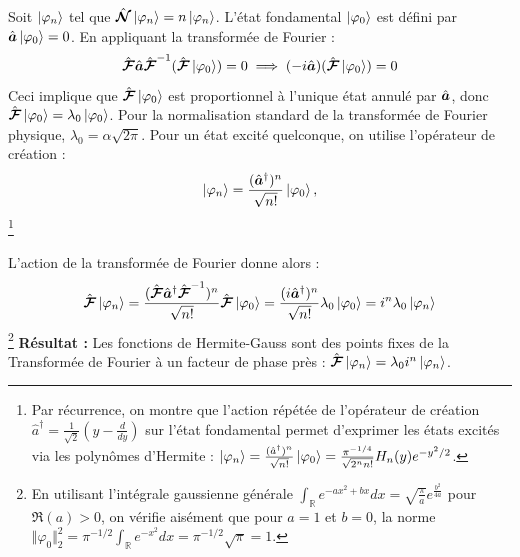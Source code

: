 \smallskip 
Soit $\ket{\varphi_n}$ tel que $\hat{\bm{\mathcal N}}\ket{\varphi_n} = n\ket{\varphi_n}$. L'état fondamental $\ket{\varphi_0}$ est défini par $\hat{\bm{a}}\ket{\varphi_0} = 0$. En appliquant la transformée de Fourier :
\begin{equation}
    \hat{\bm{\mathcal{F}}} \hat{\bm{a}} \hat{\bm{\mathcal{F}}}^{-1} (\hat{\bm{\mathcal{F}}}\ket{\varphi_0}) = 0 \implies (-i\hat{\bm{a}}) (\hat{\bm{\mathcal{F}}}\ket{\varphi_0}) = 0
\end{equation}
Ceci implique que $\hat{\bm{\mathcal{F}}}\ket{\varphi_0}$ est proportionnel à l'unique état annulé par $\hat{\bm{a}}$, donc $\hat{\bm{\mathcal{F}}}\ket{\varphi_0} = \lambda_0 \ket{\varphi_0}$. Pour la normalisation standard de la transformée de Fourier physique, $\lambda_0 = \alpha \sqrt{2 \pi}$. Pour un état excité quelconque, on utilise l'opérateur de création :
\begin{equation}
    \ket{\varphi_n} = \frac{(\hat{\bm{a}}^\dagger)^n}{\sqrt{n!}} \ket{\varphi_0},
\end{equation}
\footnote{Par récurrence, on montre que l'action répétée de l'opérateur de création $\hat{a}^\dag = \frac{1}{\sqrt{2}}(y - \frac{d}{dy})$ sur l'état fondamental permet d'exprimer les états excités via les polynômes d'Hermite : $\ket{\varphi_n} = \frac{(\hat{a}^\dag)^n}{\sqrt{n!}}\ket{\varphi_0} = \frac{\pi^{-1/4}}{\sqrt{2^n n!}} H_n(y) e^{-y^2/2}$.}

L'action de la transformée de Fourier donne alors :
\begin{equation}
    \hat{\bm{\mathcal{F}}} \ket{\varphi_n} = \frac{(\hat{\bm{\mathcal{F}}} \hat{\bm{a}}^\dagger \hat{\bm{\mathcal{F}}}^{-1})^n}{\sqrt{n!}} \hat{\bm{\mathcal{F}}} \ket{\varphi_0} = \frac{(i \hat{\bm{a}}^\dagger)^n}{\sqrt{n!}} \lambda_0 \ket{\varphi_0} = i^n \lambda_0 \ket{\varphi_n}
\end{equation}
\footnote{En utilisant l'intégrale gaussienne générale $\int_{\mathbb{R}} e^{-ax^2 + bx} dx = \sqrt{\frac{\pi}{a}} e^{\frac{b^2}{4a}}$ pour $\Re(a)>0$, on vérifie aisément que pour $a=1$ et $b=0$, la norme $\Vert\varphi_0\Vert_2^2 = \pi^{-1/2} \int_{\mathbb{R}} e^{-x^2} dx = \pi^{-1/2} \sqrt{\pi} = 1$.}
\textbf{Résultat :} Les fonctions de Hermite-Gauss sont des points fixes de la Transformée de Fourier à un facteur de phase près : $\hat{\bm{\mathcal{F}}} \ket{\varphi_n} = \lambda_0 i^n \ket{\varphi_n}$.


